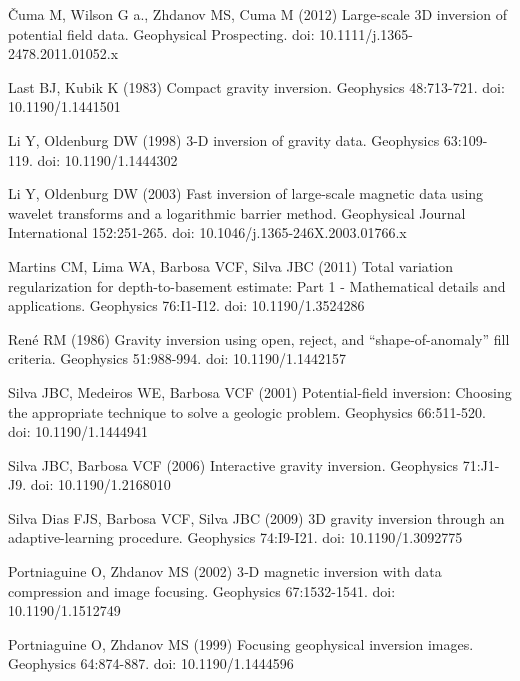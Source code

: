 \documentclass[twocolumn,draft]{svjour3}
\begin{document}
\begin{thebibliography}{}

\v{C}uma M, Wilson G a., Zhdanov MS, Cuma M (2012)
Large-scale 3D inversion of potential field data. Geophysical Prospecting.
doi: 10.1111/j.1365-2478.2011.01052.x

Last BJ, Kubik K (1983)
Compact gravity inversion. Geophysics 48:713-721. doi: 10.1190/1.1441501

Li Y, Oldenburg DW (1998)
3-D inversion of gravity data. Geophysics 63:109-119.
doi: 10.1190/1.1444302

Li Y, Oldenburg DW (2003)
Fast inversion of large-scale magnetic data using wavelet transforms and a
logarithmic barrier method. Geophysical Journal International 152:251-265.
doi: 10.1046/j.1365-246X.2003.01766.x

Martins CM, Lima WA, Barbosa VCF, Silva JBC (2011)
Total variation regularization for depth-to-basement estimate:
Part 1 - Mathematical details and applications. Geophysics 76:I1-I12.
doi: 10.1190/1.3524286

Ren\'e RM (1986)
Gravity inversion using open, reject, and ``shape-of-anomaly'' fill criteria.
Geophysics 51:988-994. doi: 10.1190/1.1442157

Silva JBC, Medeiros WE, Barbosa VCF (2001)
Potential-field inversion: Choosing the appropriate technique to solve a
geologic problem. Geophysics 66:511-520. doi: 10.1190/1.1444941

Silva JBC, Barbosa VCF (2006)
Interactive gravity inversion. Geophysics 71:J1-J9. doi: 10.1190/1.2168010

Silva Dias FJS, Barbosa VCF, Silva JBC (2009)
3D gravity inversion through an adaptive-learning procedure.
Geophysics 74:I9-I21. doi: 10.1190/1.3092775

Portniaguine O, Zhdanov MS (2002)
3‐D magnetic inversion with data compression and image focusing.
Geophysics 67:1532-1541. doi: 10.1190/1.1512749

Portniaguine O, Zhdanov MS (1999)
Focusing geophysical inversion images. Geophysics 64:874-887.
doi: 10.1190/1.1444596


\end{thebibliography}
\end{document}
